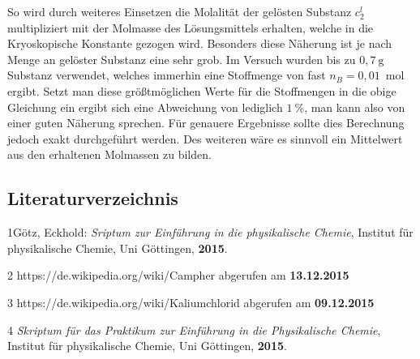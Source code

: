 \documentclass[12pt,a4paper,titlepage,headinclude,bibtotoc]{scrartcl}
\begin{document}
So wird durch weiteres Einsetzen die Molalität der gelösten Substanz $c_2^l$ multipliziert mit der Molmasse des Lösungsmittels erhalten, welche in die Kryoskopische Konstante gezogen wird. Besonders diese Näherung ist je nach Menge an gelöster Substanz eine sehr grob. Im Versuch wurden bis zu $0,7{~}\mathrm{g}$ Substanz verwendet, welches immerhin eine Stoffmenge von fast $n_B = 0,01${~}mol ergibt. Setzt man diese größtmöglichen Werte für die Stoffmengen in die obige Gleichung ein ergibt sich eine Abweichung von lediglich $1 {~} \% $, man kann also von einer guten Näherung sprechen. Für genauere Ergebnisse sollte dies Berechnung jedoch exakt durchgeführt werden. Des weiteren wäre es sinnvoll ein Mittelwert aus den erhaltenen Molmassen zu bilden.  
 


 














\newpage



\subsection{Literaturverzeichnis}
1\quad Götz, Eckhold: \emph{Sriptum zur Einführung in die physikalische Chemie}, Institut für physikalische Chemie, Uni Göttingen, \textbf{2015}.

\vspace{0,5 cm}

2 \quad https://de.wikipedia.org/wiki/Campher abgerufen am \textbf{13.12.2015}

\vspace{0,5cm}

3 \quad https://de.wikipedia.org/wiki/Kaliumchlorid abgerufen am \textbf{09.12.2015}

\vspace{0,5cm}

4 \quad \emph{Skriptum für das Praktikum zur Einführung in die Physikalische Chemie}, Institut für physikalische Chemie, Uni Göttingen, \textbf{2015}.\\
\end{document}
